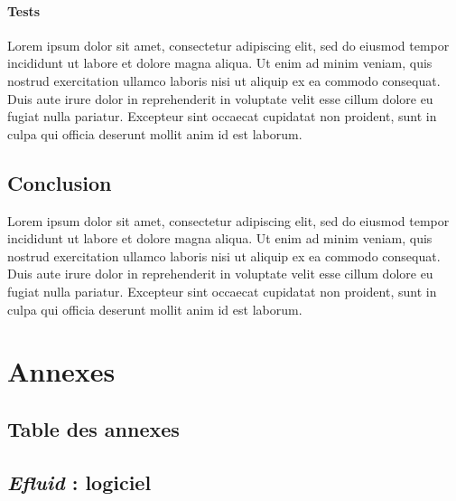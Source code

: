 \documentclass[a4paper, 12pt]{report}
\begin{document}
\subsection{Tests}

Lorem ipsum dolor sit amet, consectetur adipiscing elit, sed do eiusmod tempor incididunt ut labore et dolore magna aliqua. Ut enim ad minim veniam, quis nostrud exercitation ullamco laboris nisi ut aliquip ex ea commodo consequat. Duis aute irure dolor in reprehenderit in voluptate velit esse cillum dolore eu fugiat nulla pariatur. Excepteur sint occaecat cupidatat non proident, sunt in culpa qui officia deserunt mollit anim id est laborum.

\chapter*{Conclusion}

Lorem ipsum dolor sit amet, consectetur adipiscing elit, sed do eiusmod tempor incididunt ut labore et dolore magna aliqua. Ut enim ad minim veniam, quis nostrud exercitation ullamco laboris nisi ut aliquip ex ea commodo consequat. Duis aute irure dolor in reprehenderit in voluptate velit esse cillum dolore eu fugiat nulla pariatur. Excepteur sint occaecat cupidatat non proident, sunt in culpa qui officia deserunt mollit anim id est laborum.

\part{Annexes}
\renewcommand{\clearpage}{}
\chapter*{Table des annexes}
\renewcommand\ptctitle{}
\parttoc
\thispagestyle{empty}
\renewcommand{\clearpage}{\newpage}
\appendix

\chapter{\textit{Efluid} : logiciel}
\label{appendix:logiciel}
\end{document}
